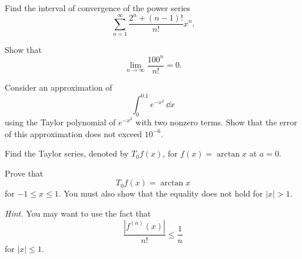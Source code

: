 \begin{problem}
Find the interval of convergence of the power series
\[
\sum_{n=1}^{\infty}
\frac{2^n+(n-1)!}{n!}x^n.
\]
\end{problem}

\begin{problem}
Show that
\[
\lim_{n\to\infty}\frac{100^n}{n!}=0.
\]
\end{problem}

\begin{problem}
Consider an approximation of
\[
\int_0^{0.1}e^{-x^2}\,\dd x
\]
using the Taylor polynomial of $e^{-x^2}$ with two nonzero terms. Show that the error of this approximation does not exceed $10^{-6}$.
\end{problem}

\begin{problem}
\begin{problemsubparts}
\item Find the Taylor series, denoted by $T_0f(x)$, for $f(x)=\arctan x$ at $a=0$.
\item Prove that
\[
T_0f(x)=\arctan x
\]
for $-1\le x\le1$. You must also show that the equality does not hold for $|x|>1$.

\textit{Hint.} You may want to use the fact that
\[
\frac{|f^{(n)}(x)|}{n!}\le\frac1n
\]
for $|x|\le1$.
\end{problemsubparts}
\end{problem}

